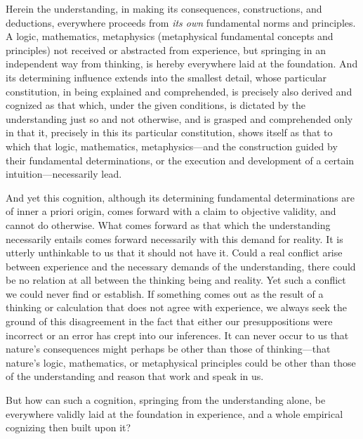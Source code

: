 \documentclass[12pt,a4paper]{book}
\begin{document}
Herein the understanding, in making its consequences, constructions, and
deductions, everywhere proceeds from \emph{its own} fundamental norms and
principles. A logic, mathematics, metaphysics (metaphysical fundamental concepts
and principles) not received or abstracted from experience, but springing in an
independent way from thinking, is hereby everywhere laid at the foundation. And
its determining influence extends into the smallest detail, whose particular
constitution, in being explained and comprehended, is precisely also derived and
cognized as that which, under the given conditions, is dictated by the
understanding just so and not otherwise, and is grasped and comprehended only in
that it, precisely in this its particular constitution, shows itself as that to
which that logic, mathematics, metaphysics---and the construction guided by their
fundamental determinations, or the execution and development of a certain
intuition---necessarily lead.

And yet this cognition, although its determining fundamental determinations are of
inner a priori origin, comes forward with a claim to objective validity, and
cannot do otherwise. What comes forward as that which the understanding
necessarily entails comes forward necessarily with this demand for reality. It is
utterly unthinkable to us that it should not have it. Could a real conflict arise
between experience and the necessary demands of the understanding, there could be
no relation at all between the thinking being and reality. Yet such a conflict we
could never find or establish. If something comes out as the result of a thinking
or calculation that does not agree with experience, we always seek the ground of
this disagreement in the fact that either our presuppositions were incorrect or an
error has crept into our inferences. It can never occur to us that nature's
consequences might perhaps be other than those of thinking---that nature's logic,
mathematics, or metaphysical principles could be other than those of the
understanding and reason that work and speak in us.

But how can such a cognition, springing from the understanding alone, be
everywhere validly laid at the foundation in experience, and a whole empirical
cognizing then built upon it?
\end{document}
